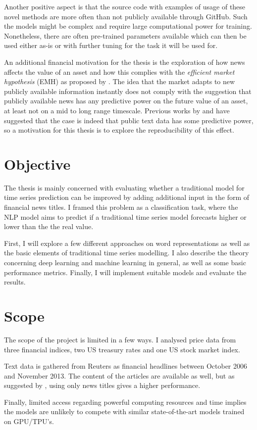 Another positive aspect is that the source code with examples of usage of these novel methods are more often than not publicly available through GitHub. Such the models might be complex and require large computational power for training. Nonetheless, there are often pre-trained parameters available which can then be used either as-is or with further tuning for the task it will be used for. 

An additional financial motivation for the thesis is the exploration of how news affects the value of an asset and how this complies with the \emph{efficient market hypothesis} (EMH) as proposed by \citet{malkiel1970efficient}. The idea that the market adapts to new publicly available information instantly does not comply with the suggestion that publicly available news has any predictive power on the future value of an asset, at least not on a mid to long range timescale. Previous works by  \citet{xing} and \citet{arorausing} have suggested that the case is indeed that public text data has some predictive power, so a motivation for this thesis is to explore the reproducibility of this effect.

\section{Objective}

The thesis is mainly concerned with evaluating whether a traditional model for time series prediction can be improved by adding additional input in the form of financial news titles.
I framed this problem as a classification task, where the NLP model aims to predict if a traditional time series model forecasts higher or lower than the the real value.

First, I will explore a few different approaches on word representations as well as the basic elements of traditional time series modelling. I also describe the theory concerning deep learning and machine learning in general, as well as some basic performance metrics. Finally, I will implement suitable models and evaluate the results.

\section{Scope}

The scope of the project is limited in a few ways. I analysed price data from three financial indices, two US treasury rates and one US stock market index. 

Text data is gathered from Reuters as financial headlines between October 2006 and November 2013. The content of the articles are available as well, but as suggested by \citet{ding2014using}, using only news titles gives a higher performance. 

Finally, limited access regarding powerful computing resources and time implies the models are unlikely to compete with similar state-of-the-art models trained on GPU/TPU's. 


